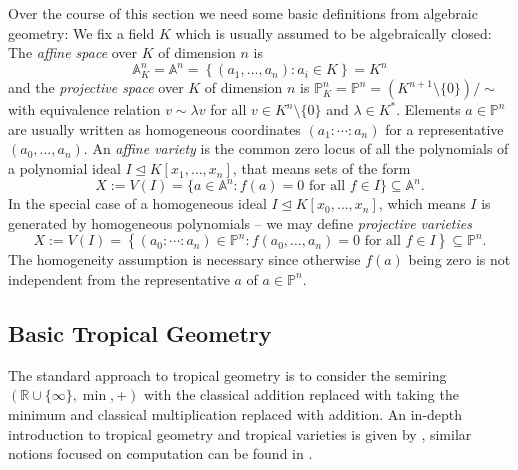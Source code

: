 \documentclass[
  paper=a4,
  titlepage,
  bibliography=totoc,
  listof=totoc,
  pagesize=pdftex
]{scrartcl}
\numberwithin{figure}{section}
\numberwithin{equation}{section}
\numberwithin{table}{section}
\newcommand*\setR{\mathds{R}}
\newcommand*\setA{\mathds{A}}
\newcommand*\setP{\mathds{P}}
\let\idealof\trianglelefteq
\theoremstyle{definition}
\numberwithin{definition}{section}
\begin{document}
Over the course of this section we need some basic definitions from algebraic geometry: We
fix a field $K$ which is usually assumed to be algebraically closed: The \emph{affine
space} over $K$ of dimension $n$ is
\[
  \setA_K^n = \setA^n = \left\{ (a_1,\dots,a_n) : a_i \in K\right\} = K^n
\]
and the \emph{projective space} over $K$ of dimension $n$ is $\setP^n_K = \setP^n =
(K^{n+1}\setminus\{0\})/\sim$ with equivalence relation $v \sim \lambda v$ for all $v \in
K^n\setminus \{0\}$ and $\lambda \in K^*$. Elements $a \in \setP^n$ are usually written as
homogeneous coordinates $(a_1:\cdots:a_n)$ for a representative $(a_0, \dots, a_n)$. An
\emph{affine variety} is the common zero locus of all the polynomials of a polynomial
ideal $I \idealof K[x_1, \dots, x_n]$, that means sets of the form
\[
  X := V(I) = \{ a \in \setA^n : f(a) = 0 \text{ for all $f\in I$} \} \subseteq \setA^n.
\]
In the special case of a homogeneous ideal $I \idealof K[x_0,\dots,x_n]$, which means $I$
is generated by homogeneous polynomials -- we may define \emph{projective varieties}
\[
  X := V(I) = \left\{ (a_0:\cdots:a_n) \in \setP^n : f(a_0, \dots, a_n) = 0
    \text{ for all $f \in I$}
  \right\} \subseteq \setP^n.
\]
The homogeneity assumption is necessary since otherwise $f(a)$ being zero is not
independent from the representative $a$ of $a\in \setP^n$.

\subsection{Basic Tropical Geometry}
\label{sec:tropIntro}

The standard approach to tropical geometry is to consider the semiring $(\setR \cup
\{\infty\}, \min, +)$ with the classical addition replaced with taking the minimum and
classical multiplication replaced with addition. An in-depth introduction to tropical
geometry and tropical varieties is given by \cite{sturmMacTrop}, similar notions focused
on computation can be found in \cite{compTropVar}.
\end{document}
